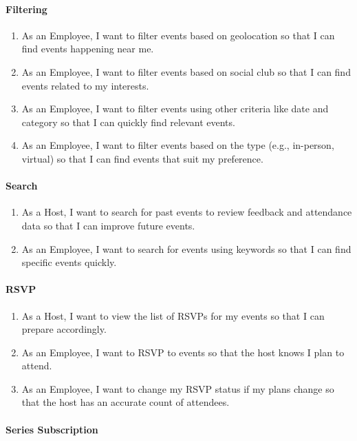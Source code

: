 \documentclass[a4paper,12pt]{article}
\begin{document}
\paragraph{Filtering}

\begin{enumerate}
    \item As an Employee, I want to filter events based on geolocation so that I can find events happening near me.
    \item As an Employee, I want to filter events based on social club so that I can find events related to my interests.
    \item As an Employee, I want to filter events using other criteria like date and category so that I can quickly 
    find relevant events.
    \item As an Employee, I want to filter events based on the type (e.g., in-person, virtual) so that I can find 
    events that suit my preference.
\end{enumerate}

\paragraph{Search}

\begin{enumerate}
    \item As a Host, I want to search for past events to review feedback and attendance data so that I can improve future events.
    \item As an Employee, I want to search for events using keywords so that I can find specific events quickly.
\end{enumerate}

\paragraph{RSVP}

\begin{enumerate}
    \item As a Host, I want to view the list of RSVPs for my events so that I can prepare accordingly.
    \item As an Employee, I want to RSVP to events so that the host knows I plan to attend.
    \item As an Employee, I want to change my RSVP status if my plans change so that the host has an accurate count of attendees.
\end{enumerate}

\paragraph{Series Subscription}
\end{document}
